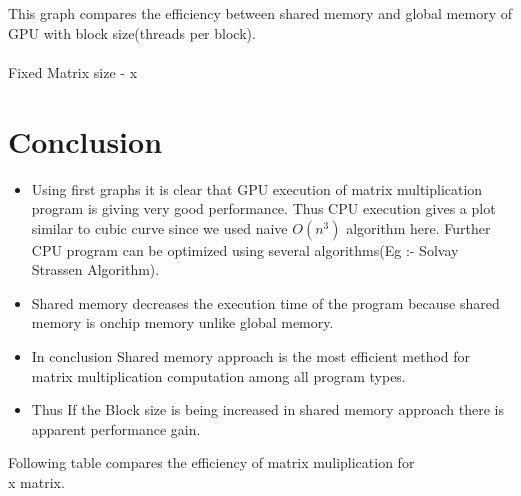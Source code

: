 \documentclass[12pt, a4paper]{article}
\begin{document}
	\par
	This graph compares the efficiency between shared memory and global memory of GPU with block size(threads per block).
	\\
	\\
	Fixed Matrix size - x 
	\hfill \break


	\newpage
	\section{Conclusion}

	\begin{itemize}
		\item Using first graphs it is clear that GPU execution of matrix multiplication program is giving very good performance. Thus CPU execution gives a plot similar to cubic curve since we used naive $O(n^3)$ algorithm here. Further CPU program can be optimized using several algorithms(Eg :- Solvay Strassen Algorithm).

		\item Shared memory decreases the execution time of the program because shared memory is onchip memory unlike global memory. 

		\item In conclusion Shared memory approach is the most efficient method for matrix multiplication computation among all program types.

		\item Thus If the Block size is being increased in shared memory approach there is apparent performance gain.
	\end{itemize}

	\hfill \break
	Following table compares the efficiency of matrix muliplication for \\ x matrix.
	\hfill \break
\end{document}
